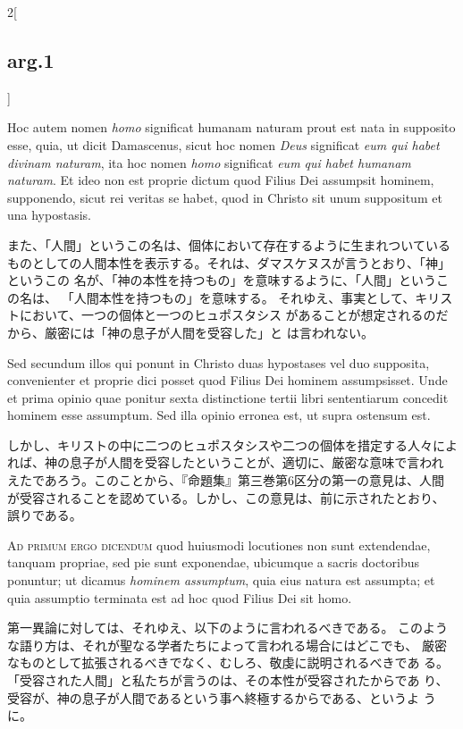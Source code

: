 \documentclass[paper=a4paper,fontsize=10pt,jafontsize=9pt,titlepage]{jlreq}
\begin{document}
\begin{paracol}{2}[\subsection{arg.1}]
\switchcolumn*

Hoc autem nomen {\itshape homo}
significat humanam naturam prout est nata in supposito esse, quia, ut
dicit Damascenus, sicut hoc nomen {\itshape Deus} significat {\itshape eum qui habet divinam
naturam}, ita hoc nomen {\itshape homo} significat {\itshape eum qui habet humanam naturam}. Et
ideo non est proprie dictum quod Filius Dei assumpsit hominem,
supponendo, sicut rei veritas se habet, quod in Christo sit unum
suppositum et una hypostasis.

\switchcolumn

また、「人間」というこの名は、個体において存在するように生まれついている
 ものとしての人間本性を表示する。それは、ダマスケヌスが言うとおり、「神」というこの
 名が、「神の本性を持つもの」を意味するように、「人間」というこの名は、
 「人間本性を持つもの」を意味する。
それゆえ、事実として、キリストにおいて、一つの個体と一つのヒュポスタシス
 があることが想定されるのだから、厳密には「神の息子が人間を受容した」と
 は言われない。

\switchcolumn*

Sed secundum illos qui ponunt in Christo
duas hypostases vel duo supposita, convenienter et proprie dici posset
quod Filius Dei hominem assumpsisset. Unde et prima opinio quae ponitur
sexta distinctione tertii libri sententiarum concedit hominem esse
assumptum. Sed illa opinio erronea est, ut supra ostensum est.

\switchcolumn

しかし、キリストの中に二つのヒュポスタシスや二つの個体を措定する人々によ
 れば、神の息子が人間を受容したということが、適切に、厳密な意味で言われ
 えたであろう。このことから、『命題集』第三巻第6区分の第一の意見は、人間
 が受容されることを認めている。しかし、この意見は、前に示されたとおり、
 誤りである。

\switchcolumn*[\subsection{ad.1}]

{\scshape Ad primum ergo dicendum} quod huiusmodi locutiones non sunt extendendae,
tanquam propriae, sed pie sunt exponendae, ubicumque a sacris doctoribus
ponuntur; ut dicamus {\itshape hominem assumptum}, quia eius natura est assumpta;
et quia assumptio terminata est ad hoc quod Filius Dei sit homo.

\switchcolumn

第一異論に対しては、それゆえ、以下のように言われるべきである。
このような語り方は、それが聖なる学者たちによって言われる場合にはどこでも、
 厳密なものとして拡張されるべきでなく、むしろ、敬虔に説明されるべきであ
 る。「受容された人間」と私たちが言うのは、その本性が受容されたからであ
 り、受容が、神の息子が人間であるという事へ終極するからである、というよ
 うに。


\end{paracol}
\end{document}
